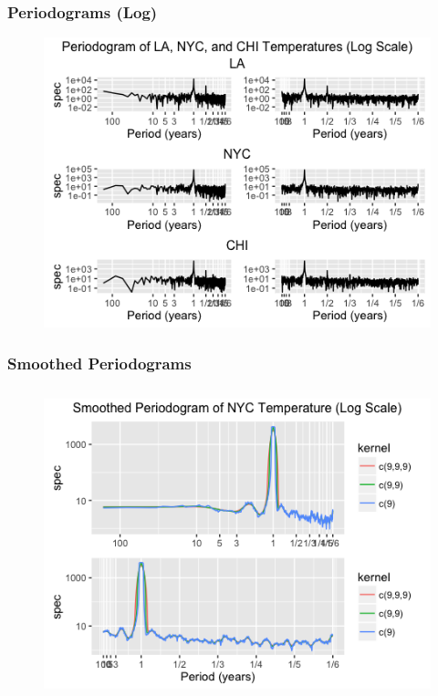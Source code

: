 \documentclass[12pt]{article}
\begin{document}
\subsubsection{Periodograms (Log)} \label{sec:period}
\begin{figure}[H]
    \includegraphics[width=\textwidth]{Figures/cityPeriodLog.png}
\end{figure}


\subsubsection{Smoothed Periodograms} \label{sec:periodSmooth}
\begin{figure}[H]
    \includegraphics[width=\textwidth, height=9cm]{Figures/nycSmooth.png}
\end{figure}
\end{document}
